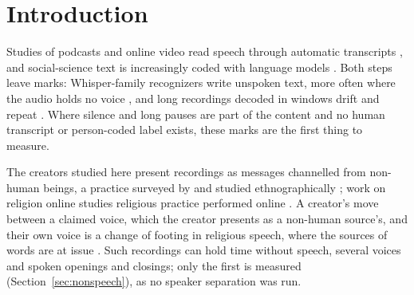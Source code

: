 
\section{Introduction}
\label{sec:intro}

Studies of podcasts and online video read speech through automatic transcripts \cite{clifton2020podcasts,litterer2024mapping,matos2026misinformation}, and social-science text is increasingly coded with language models \cite{gilardi2023chatgpt,ziems2024can,tornberg2024best}. Both steps leave marks: Whisper-family recognizers \cite{radford2022robust} write unspoken text, more often where the audio holds no voice \cite{koenecke2024careless}, and long recordings decoded in windows drift and repeat \cite{bain2023whisperx}. Where silence and long pauses are part of the content and no human transcript or person-coded label exists, these marks are the first thing to measure.

The creators studied here present recordings as messages channelled from non-human beings, a practice surveyed by \citet{klimo1987channeling} and studied ethnographically \cite{brown1997channeling}; work on religion online studies religious practice performed online \cite{helland2005online,campbell2012understanding}. A creator's move between a claimed voice, which the creator presents as a non-human source's, and their own voice is a change of footing \cite{goffman1979footing} in religious speech, where the sources of words are at issue \cite{keane1997religious}. Such recordings can hold time without speech, several voices and spoken openings and closings; only the first is measured (Section~\ref{sec:nonspeech}), as no speaker separation was run.


